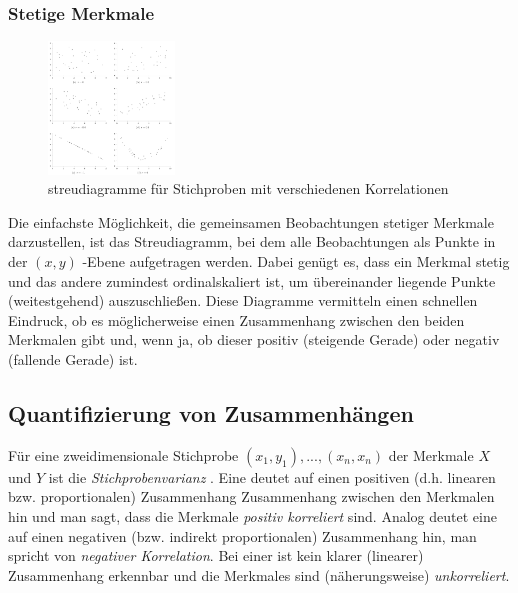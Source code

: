 \subsubsection{Stetige Merkmale}
\begin{figure}
    \vspace{-8mm}
    \centering
    \includegraphics[width=0.3\textwidth]{images/3.4_streudiagramme_mit_unterschiedlicher_kor.png}
    \caption{streudiagramme für Stichproben mit verschiedenen Korrelationen}
    \vspace{-12mm}
    \label{fig:streudiagramme}
\end{figure}
Die einfachste Möglichkeit, die gemeinsamen Beobachtungen stetiger Merkmale darzustellen, ist das Streudiagramm, bei dem alle Beobachtungen als Punkte in der $(x, y)$ -Ebene aufgetragen werden. Dabei genügt es, dass ein Merkmal stetig und das andere zumindest ordinalskaliert ist, um übereinander liegende Punkte (weitestgehend) auszuschließen. Diese Diagramme vermitteln einen schnellen Eindruck, ob es möglicherweise einen Zusammenhang zwischen den beiden Merkmalen gibt und, wenn ja, ob dieser positiv (steigende Gerade) oder negativ (fallende Gerade) ist.

\subsection{Quantifizierung von Zusammenhängen}
Für eine zweidimensionale Stichprobe $(x_1, y_1), ..., (x_n, x_n)$ der Merkmale $X$ und $Y$ ist die \emph{Stichprobenvarianz} . Eine  deutet auf einen positiven (d.h. linearen bzw. proportionalen) Zusammenhang Zusammenhang zwischen den Merkmalen hin und man sagt, dass die Merkmale \emph{positiv korreliert} sind. Analog deutet eine  auf einen negativen (bzw. indirekt proportionalen) Zusammenhang hin, man spricht von \emph{negativer Korrelation}. Bei einer  ist kein klarer (linearer) Zusammenhang erkennbar und die Merkmales sind (näherungsweise) \emph{unkorreliert}.\\\\

